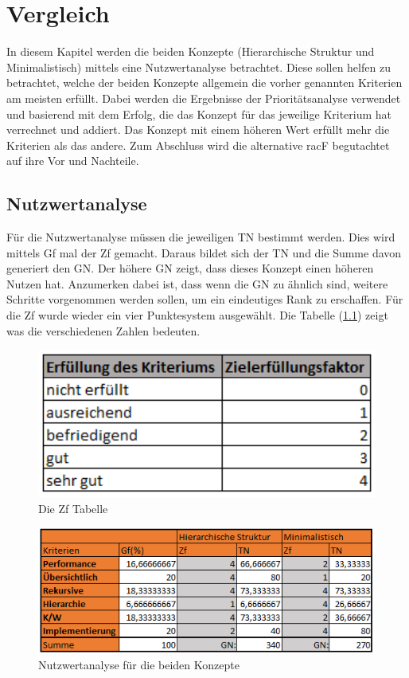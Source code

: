 \chapter{Vergleich}
\label{ch:chapter05}
In diesem Kapitel werden die beiden Konzepte (Hierarchische Struktur und Minimalistisch) mittels eine Nutzwertanalyse betrachtet.
Diese sollen helfen zu betrachtet, welche der beiden Konzepte allgemein die vorher genannten Kriterien am meisten erfüllt.
Dabei werden die Ergebnisse der Prioritätsanalyse verwendet und basierend mit dem Erfolg, die das Konzept für das jeweilige Kriterium hat verrechnet und addiert.
Das Konzept mit einem höheren Wert erfüllt mehr die Kriterien als das andere.
Zum Abschluss wird die alternative racF begutachtet auf ihre Vor und Nachteile.

\section{Nutzwertanalyse}
\label{sec:chapter05:Nutz}
Für die Nutzwertanalyse müssen die jeweiligen \ac{TN} bestimmt werden.
Dies wird mittels \ac{Gf} mal der \ac{Zf} gemacht.
Daraus bildet sich der \ac{TN} und die Summe davon generiert den \ac{GN}.
Der höhere \ac{GN} zeigt, dass dieses Konzept einen höheren Nutzen hat.
Anzumerken dabei ist, dass wenn die \ac{GN} zu ähnlich sind, weitere Schritte vorgenommen werden sollen, um ein eindeutiges Rank zu erschaffen.
Für die \ac{Zf} wurde wieder ein vier Punktesystem ausgewählt.
Die Tabelle (\ref{fig:Ziel}) zeigt was die verschiedenen Zahlen bedeuten. \cite{BdIufH}
\begin{figure}[h!]
 \centering
 \includegraphics[width=1\textwidth]{gfx/Picture/Ziel.PNG}
 \caption{Die Zf Tabelle}
 \label{fig:Ziel}
\end{figure}
\newpage
\begin{figure}[h!]
 \centering
 \includegraphics[width=1\textwidth]{gfx/Picture/Nutzwert.PNG}
 \caption{Nutzwertanalyse für die beiden Konzepte}
 \label{fig:Nutz}
\end{figure}

